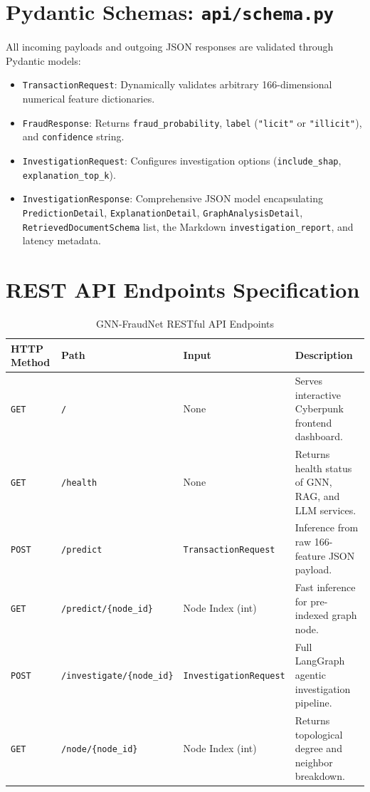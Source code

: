 \documentclass[11pt,a4paper]{report}
\begin{document}
\section{Pydantic Schemas: \texttt{api/schema.py}}
All incoming payloads and outgoing JSON responses are validated through Pydantic models:
\begin{itemize}[leftmargin=1.5em]
  \item \texttt{TransactionRequest}: Dynamically validates arbitrary 166-dimensional numerical feature dictionaries.
  \item \texttt{FraudResponse}: Returns \texttt{fraud\_probability}, \texttt{label} (\texttt{"licit"} or \texttt{"illicit"}), and \texttt{confidence} string.
  \item \texttt{InvestigationRequest}: Configures investigation options (\texttt{include\_shap}, \texttt{explanation\_top\_k}).
  \item \texttt{InvestigationResponse}: Comprehensive JSON model encapsulating \texttt{PredictionDetail}, \texttt{ExplanationDetail}, \texttt{GraphAnalysisDetail}, \texttt{RetrievedDocumentSchema} list, the Markdown \texttt{investigation\_report}, and latency metadata.
\end{itemize}

\section{REST API Endpoints Specification}
\begin{table}[h]
\centering
\small
\begin{tabular}{lllp{6cm}}
\toprule
\textbf{HTTP Method} & \textbf{Path} & \textbf{Input} & \textbf{Description} \\
\midrule
\texttt{GET} & \texttt{/} & None & Serves interactive Cyberpunk frontend dashboard. \\
\texttt{GET} & \texttt{/health} & None & Returns health status of GNN, RAG, and LLM services. \\
\texttt{POST} & \texttt{/predict} & \texttt{TransactionRequest} & Inference from raw 166-feature JSON payload. \\
\texttt{GET} & \texttt{/predict/\{node\_id\}} & Node Index (int) & Fast inference for pre-indexed graph node. \\
\texttt{POST} & \texttt{/investigate/\{node\_id\}} & \texttt{InvestigationRequest} & Full LangGraph agentic investigation pipeline. \\
\texttt{GET} & \texttt{/node/\{node\_id\}} & Node Index (int) & Returns topological degree and neighbor breakdown. \\
\bottomrule
\end{tabular}
\caption{GNN-FraudNet RESTful API Endpoints}
\end{table}
\end{document}
